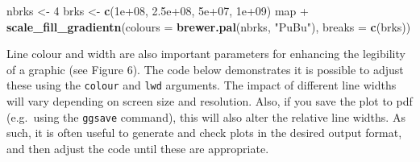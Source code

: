 \documentclass[]{article}
\newenvironment{Shaded}{}{}
\newcommand{\KeywordTok}[1]{\textcolor[rgb]{0.00,0.44,0.13}{\textbf{{#1}}}}
\newcommand{\DataTypeTok}[1]{\textcolor[rgb]{0.56,0.13,0.00}{{#1}}}
\newcommand{\DecValTok}[1]{\textcolor[rgb]{0.25,0.63,0.44}{{#1}}}
\newcommand{\FloatTok}[1]{\textcolor[rgb]{0.25,0.63,0.44}{{#1}}}
\newcommand{\StringTok}[1]{\textcolor[rgb]{0.25,0.44,0.63}{{#1}}}
\newcommand{\NormalTok}[1]{{#1}}
\begin{document}
\begin{Shaded}
\begin{Highlighting}[]
\NormalTok{nbrks <- }\DecValTok{4}
\NormalTok{brks <- }\KeywordTok{c}\NormalTok{(}\FloatTok{1e+08}\NormalTok{, }\FloatTok{2.5e+08}\NormalTok{, }\FloatTok{5e+07}\NormalTok{, }\FloatTok{1e+09}\NormalTok{)}
\NormalTok{map + }\KeywordTok{scale_fill_gradientn}\NormalTok{(}\DataTypeTok{colours =} \KeywordTok{brewer.pal}\NormalTok{(nbrks, }\StringTok{"PuBu"}\NormalTok{), }\DataTypeTok{breaks =} \KeywordTok{c}\NormalTok{(brks))}
\end{Highlighting}
\end{Shaded}


Line colour and width are also important parameters for enhancing the legibility of a graphic (see Figure 6). The code below demonstrates it
is possible to adjust these using the \texttt{colour} and \texttt{lwd}
arguments. The impact of different line widths will vary depending on screen size and resolution. Also, if you save the plot to pdf (e.g.~using
the \texttt{ggsave} command), this will also alter the relative line widths. As such, it is often useful to generate and check plots in the desired output format, and then adjust the code until these
are appropriate.
\end{document}
